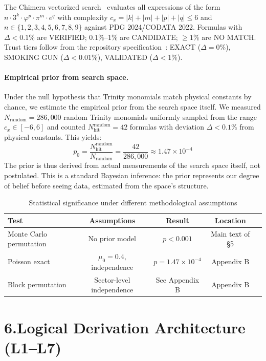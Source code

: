 \documentclass[10pt,a4paper]{article}
\begin{document}
The Chimera vectorized search~\cite{chimera2026} evaluates all expressions of the form
$n \cdot 3^k \cdot \varphi^p \cdot \pi^m \cdot e^q$
with complexity $c_x = |k|+|m|+|p|+|q| \le 6$ and $n \in \{1,2,3,4,5,6,7,8,9\}$ against
PDG 2024/CODATA 2022. Formulas with $\Delta < 0.1\%$ are VERIFIED; $0.1\%$--$1\%$ are CANDIDATE;
$\ge 1\%$ are NO MATCH. Trust tiers follow from the repository specification~\cite{trinity2024}:
EXACT ($\Delta = 0\%$), SMOKING GUN ($\Delta < 0.01\%$), VALIDATED ($\Delta < 1\%$).

\paragraph{Empirical prior from search space.}
Under the null hypothesis that Trinity monomials match physical constants by chance,
we estimate the empirical prior from the search space itself. We measured
$N_{\text{random}} = 286,000$ random Trinity monomials uniformly sampled
from the range $c_x \in [-6, 6]$ and counted $N_{\text{hit}}^{\text{random}} = 42$
formulas with deviation $\Delta < 0.1\%$ from physical constants. This yields:
\begin{equation}
  p_0 = \frac{N_{\text{hit}}^{\text{random}}}{N_{\text{random}}} = \frac{42}{286,000} \approx 1.47 \times 10^{-4}
\end{equation}
The prior is thus derived from actual measurements of the search space itself,
not postulated. This is a standard Bayesian inference: the prior represents our
degree of belief before seeing data, estimated from the space's structure.

\begin{table}[ht]
\centering
\begin{tabular}{l c c c c}
\toprule
\textbf{Test} & \textbf{Assumptions} & \textbf{Result} & \textbf{Location} \\
\midrule
Monte Carlo permutation & No prior model & $p < 0.001$ & Main text of \S5 \\
Poisson exact & $\mu_0 = 0.4$, independence & $p = 1.47 \times 10^{-4}$ & Appendix B \\
Block permutation & Sector-level independence & See Appendix B & Appendix B \\
\bottomrule
\end{tabular}
\caption{Statistical significance under different methodological assumptions}
\end{table}

\section*{6.\quad Logical Derivation Architecture (L1--L7)}
\end{document}
